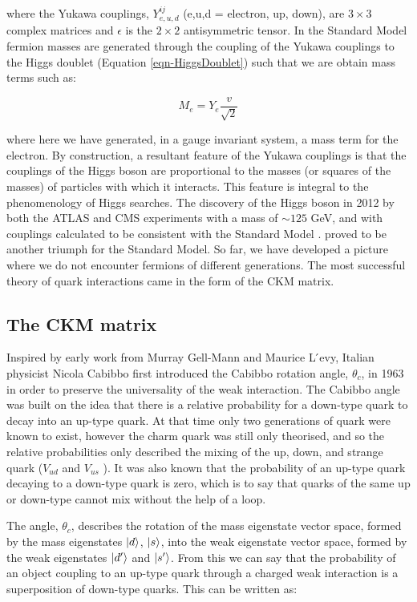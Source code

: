where the Yukawa couplings, $Y^{ij}_{e,u,d}$ (e,u,d = electron, up, down), are $3\times3$ complex matrices and $\epsilon$ is the $2\times2$ antisymmetric tensor. In the Standard Model fermion masses are generated through the coupling of the Yukawa couplings to the Higgs doublet (Equation \ref{eqn-HiggsDoublet}) such that we are obtain mass terms such as:

\begin{equation}
M_e = Y_e\frac{v}{\sqrt{2}}
\end{equation}

where here we have generated, in a gauge invariant system, a mass term for the electron. By construction, a resultant feature of the Yukawa couplings is that the couplings of the Higgs boson are proportional to the masses (or squares of the masses) of particles with which it interacts. This feature is integral to the phenomenology of Higgs searches. The discovery of the Higgs boson in 2012 by both the ATLAS \cite{Aad:2012tfa} and CMS \cite{b846af59f42d440a9058d93ed5df44cf} experiments with a mass of $\sim125$ GeV, and with couplings calculated to be consistent with the Standard Model \cite{Chatrchyan:2013lba, Aad:2013wqa}. proved to be another triumph for the Standard Model. So far, we have developed a picture where we do not encounter fermions of different generations. The most successful theory of quark interactions came in the form of the CKM matrix.

\subsection{The CKM matrix}

Inspired by early work from Murray Gell-Mann and Maurice L ́evy, Italian physicist Nicola Cabibbo first introduced the Cabibbo rotation angle, $
θ_c$, in 1963 \cite{PhysRevLett.10.531} in order to preserve the universality of the weak interaction. The Cabibbo angle was built on the idea 
that there is a relative probability for a down-type quark to decay into an up-type quark. At that time only two generations of quark were 
known to exist, however the charm quark was still only theorised, and so the relative probabilities only described the mixing of the up, down,
and strange quark ($V_{ud}$ and $V_{us}$ ). It was also known that the probability of an up-type quark decaying to a down-type quark is zero, 
which is to say that quarks of the same up or down-type cannot mix without the help of a loop.

The angle, $θ_c$, describes the rotation of the mass eigenstate vector space, formed by the mass eigenstates $\ket{d}$, $\ket{s}$, into the 
weak eigenstate vector space, formed by the weak eigenstates $\ket{d'}$ and $\ket{s'}$. From this we can say that the probability of an object 
coupling to an up-type quark through a charged weak interaction is a superposition of down-type quarks. This can be written as:

